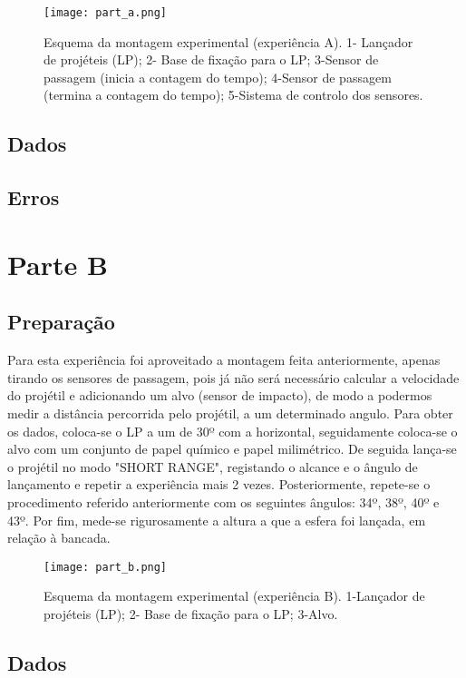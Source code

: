 \documentclass{report}
\begin{document}
\begin{figure}
	\centering
	\texttt{[image: part\_a.png]}
	\caption{Esquema da montagem experimental (experiência A). 1- Lançador de projéteis (LP); 2-
	Base de fixação para o LP; 3-Sensor de passagem (inicia a contagem do tempo); 4-Sensor de
	passagem (termina a contagem do tempo); 5-Sistema de controlo dos sensores.}
	\label{fig:parteA}
\end{figure}

\section{Dados}

\section{Erros}

\chapter{Parte B}

\section{Preparação}

	Para esta experiência foi aproveitado a montagem feita anteriormente, apenas tirando
	os sensores de passagem, pois já não será necessário calcular a velocidade do projétil 
	e adicionando um alvo (sensor de impacto), de modo a podermos medir a distância percorrida 
	pelo projétil, a um determinado angulo.
	Para obter os dados, coloca-se o LP a um de 30º com a horizontal, seguidamente coloca-se o alvo com 
	um conjunto de papel químico e papel milimétrico. De seguida lança-se o projétil no modo "SHORT RANGE", 
	registando o alcance e o ângulo de lançamento e repetir a experiência mais 2 vezes.
	Posteriormente, repete-se o procedimento referido anteriormente com os seguintes ângulos: 34º, 38º, 40º e 43º.
	Por fim, mede-se rigurosamente a altura a que a esfera foi lançada, em relação à bancada.

\begin{figure}
	\centering
	\texttt{[image: part\_b.png]}
	\caption{Esquema da montagem experimental (experiência B). 1-Lançador de projéteis (LP); 2-
	Base de fixação para o LP; 3-Alvo.}
\end{figure}

\section{Dados}
\end{document}
